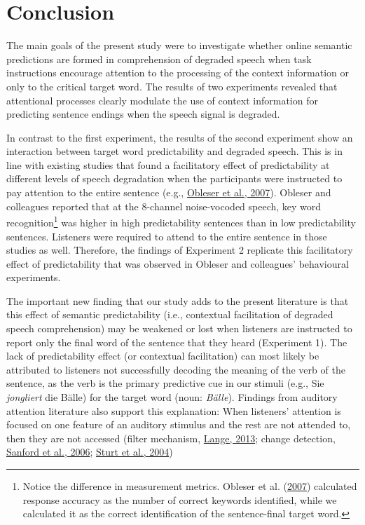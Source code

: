 \documentclass[a4paper, nobind]{templates/ociamthesis}
\begin{document}
\hypertarget{conclusion}{%
\section{Conclusion}\label{conclusion}}

The main goals of the present study were to investigate whether online semantic predictions are formed in comprehension of degraded speech when task instructions encourage attention to the processing of the context information or only to the critical target word.
The results of two experiments revealed that attentional processes clearly modulate the use of context information for predicting sentence endings when the speech signal is degraded.

In contrast to the first experiment, the results of the second experiment show an interaction between target word predictability and degraded speech.
This is in line with existing studies that found a facilitatory effect of predictability at different levels of speech degradation when the participants were instructed to pay attention to the entire sentence (e.g., \protect\hyperlink{ref-Obleser2007}{Obleser et al., 2007}).
Obleser and colleagues reported that at the 8-channel noise-vocoded speech, key word recognition\footnote{Notice the difference in measurement metrics. Obleser et al. (\protect\hyperlink{ref-Obleser2007}{2007}) calculated response accuracy as the number of correct keywords identified, while we calculated it as the correct identification of the sentence-final target word.} was higher in high predictability sentences than in low predictability sentences.
Listeners were required to attend to the entire sentence in those studies as well.
Therefore, the findings of Experiment 2 replicate this facilitatory effect of predictability that was observed in Obleser and colleagues' behavioural experiments.

The important new finding that our study adds to the present literature is that this effect of semantic predictability (i.e., contextual facilitation of degraded speech comprehension) may be weakened or lost when listeners are instructed to report only the final word of the sentence that they heard (Experiment 1).
The lack of predictability effect (or contextual facilitation) can most likely be attributed to listeners not successfully decoding the meaning of the verb of the sentence, as the verb is the primary predictive cue in our stimuli (e.g., Sie \emph{jongliert} die Bälle) for the target word (noun: \emph{Bälle}).
Findings from auditory attention literature also support this explanation:
When listeners' attention is focused on one feature of an auditory stimulus and the rest are not attended to, then they are not accessed (filter mechanism, \protect\hyperlink{ref-Lange2013}{Lange, 2013}; change detection, \protect\hyperlink{ref-Sanford2006}{Sanford et al., 2006}; \protect\hyperlink{ref-Sturt2004}{Sturt et al., 2004})
\end{document}
